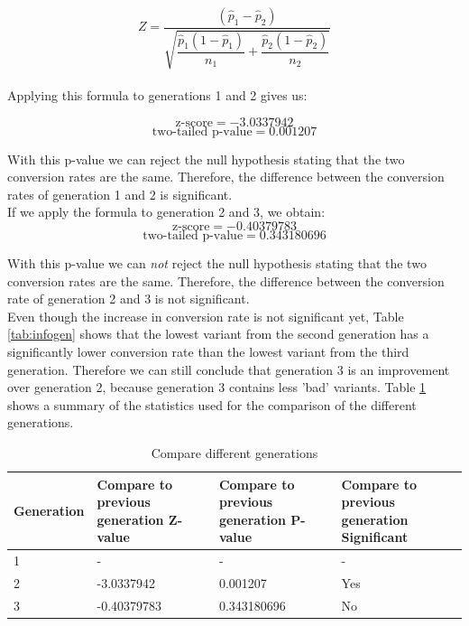 \documentclass{report}
\begin{document}
$$Z=\dfrac{(\hat{p}_1-\hat{p}_2)}{\sqrt{\dfrac{\hat{p}_1(1-\hat{p}_1)}{n_1}+\dfrac{\hat{p}_2(1-\hat{p}_2)}{n_2}}}$$\\

Applying this formula to generations 1 and 2 gives us:

$$\text{z-score} = -3.0337942$$
$$\text{two-tailed p-value} = 0.001207$$

With this p-value we can reject the null hypothesis stating that the two conversion rates are the same. Therefore, the difference between the conversion rates of generation 1 and 2 is significant. \\

If we apply the formula to generation 2 and 3, we obtain:
$$\text{z-score} = -0.40379783$$
$$\text{two-tailed p-value} = 0.343180696$$

With this p-value we can \textit{not} reject the null hypothesis stating that the two conversion rates are the same. Therefore, the difference between the conversion rate of generation 2 and 3 is not significant.\\

Even though the increase in conversion rate is not significant yet, Table \ref{tab:infogen} shows that the lowest variant from the second generation has a significantly lower conversion rate than the lowest variant from the third generation. Therefore we can still conclude that generation 3 is an improvement over generation 2, because generation 3 contains less 'bad' variants. Table \ref{tab:comgen} shows a summary of the statistics used for the comparison of the different generations.\\

\begin{table}[h]
 \begin{tabular}{|p{2cm}|p{3.5cm}|p{3.5cm}|p{3.5cm}|}
    \hline
\textbf{Generation} & Compare to \newline previous generation \newline \textbf{Z-value} & Compare to \newline previous generation \newline \textbf{P-value} & Compare to \newline previous generation \newline \textbf{Significant} \\ \hline
    1                       & -                                       & -                                       & -                                           \\\hline
    2                       & -3.0337942                              & 0.001207                                & Yes                                         \\\hline
    3                       & -0.40379783                             & 0.343180696                             & No                                          \\\hline

	\end{tabular}
	\caption {Compare different generations}
	\label{tab:comgen}
\end{table}
\end{document}
